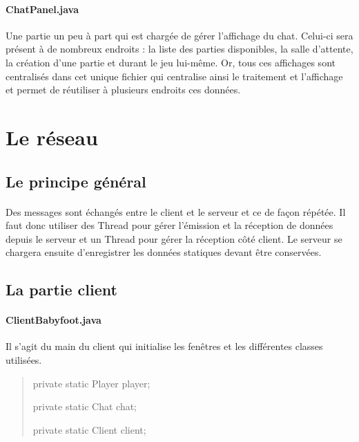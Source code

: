 \documentclass[a4paper,12pt]{report}
\begin{document}
\paragraph{ChatPanel.java}
Une partie un peu à part qui est chargée de gérer l'affichage du chat. Celui-ci sera présent à de nombreux endroits : la liste des parties disponibles, la salle d'attente, la création d'une partie et durant le jeu lui-même. Or, tous ces affichages sont centralisés dans cet unique fichier qui centralise ainsi le traitement et l'affichage et permet de réutiliser à plusieurs endroits ces données.


\section{Le réseau}
\subsection{Le principe général}
\paragraph{}
Des messages sont échangés entre le client et le serveur et ce de façon répétée. Il faut donc utiliser des Thread pour gérer l'émission et la réception de données depuis le serveur et un Thread pour gérer la réception côté client. Le serveur se chargera ensuite d'enregistrer les données statiques devant être conservées.
\subsection{La partie client}
\paragraph{ClientBabyfoot.java}
Il s'agit du main du client qui initialise les fenêtres et les différentes classes utilisées.
\begin{quote}
	private static Player player;
    
	private static Chat chat;
    
	private static Client client;
\end{quote}
\end{document}
